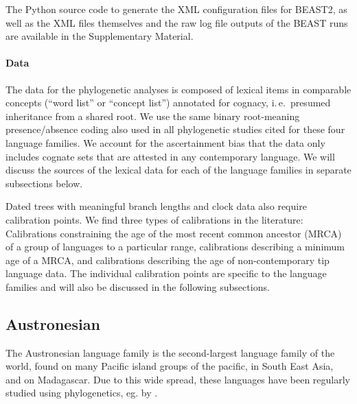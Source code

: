 \documentclass[]{rsos}%
\begin{document}
The Python source code to generate the XML configuration files for BEAST2, as well as
the XML files themselves and the raw log file outputs of the BEAST runs are
available in the Supplementary Material.


\paragraph{Data}

The data for the phylogenetic analyses is composed of lexical items in comparable concepts (“word list” or “concept list”) annotated
for cognacy, i.\,e.\ presumed inheritance from a shared root.
We use the same binary root-meaning presence/absence coding also used in all
phylogenetic studies cited for these four language families.
We account for the ascertainment bias that the data
only includes cognate sets that are attested in any contemporary language.
We will discuss the sources of the lexical data for each of the language families in separate subsections below.

Dated trees with meaningful branch lengths and clock data also require calibration points.
We find three types of calibrations in the literature: Calibrations constraining the age of the most recent common ancestor (MRCA) of a group of languages to a particular range, calibrations describing a minimum age of a MRCA, and calibrations describing the age of non-contemporary tip language data.
The individual calibration points are specific to the language families and will also be discussed in the following subsections.



\subsection{Austronesian}\label{s:austronesian}

The Austronesian language family is the second-largest language family of the world, found on many Pacific island groups of the pacific, in South East Asia, and on Madagascar.
Due to this wide spread, these languages have been regularly studied using phylogenetics, eg. by
\textcite{gray2009language,greenhill2017evolutionary,greenhill2018population}.
\end{document}
